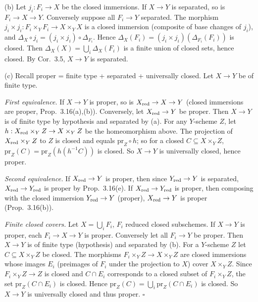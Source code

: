 \documentclass[11pt]{article}
\begin{document}
(b) Let $j_i:F_i\to X$ be the closed immersions. If $X\to Y$ is separated, so is $F_i\to X\to Y$. Conversely suppose all $F_i\to Y$ separated. The morphism $j_i\times j_i:F_i\times_YF_i\to X\times_YX$ is a closed immersion (composite of base changes of $j_i$), and $\Delta_X\circ j_i=(j_i\times j_i)\circ\Delta_{F_i}$. Hence $\Delta_X(F_i)=(j_i\times j_i)(\Delta_{F_i}(F_i))$ is closed. Then $\Delta_X(X)=\bigcup_i\Delta_X(F_i)$ is a finite union of closed sets, hence closed. By Cor.~3.5, $X\to Y$ is separated.

(c) Recall proper = finite type + separated + universally closed. Let $X\to Y$ be of finite type.

\emph{First equivalence.} If $X\to Y$ is proper, so is $X_{\rm red}\to X\to Y$ (closed immersions are proper, Prop.~3.16(a),(b)). Conversely, let $X_{\rm red}\to Y$ be proper. Then $X\to Y$ is of finite type by hypothesis and separated by (a). For any $Y$-scheme $Z$, let $h:X_{\rm red}\times_YZ\to X\times_YZ$ be the homeomorphism above. The projection of $X_{\rm red}\times_YZ$ to $Z$ is closed and equals $\mathrm{pr}_Z\circ h$; so for a closed $C\subseteq X\times_YZ$, $\mathrm{pr}_Z(C)=\mathrm{pr}_Z(h(h^{-1}C))$ is closed. So $X\to Y$ is universally closed, hence proper.

\emph{Second equivalence.} If $X_{\rm red}\to Y$ is proper, then since $Y_{\rm red}\to Y$ is separated, $X_{\rm red}\to Y_{\rm red}$ is proper by Prop.~3.16(e). If $X_{\rm red}\to Y_{\rm red}$ is proper, then composing with the closed immersion $Y_{\rm red}\to Y$ (proper), $X_{\rm red}\to Y$ is proper (Prop.~3.16(b)).

\emph{Finite closed covers.} Let $X=\bigcup_iF_i$, $F_i$ reduced closed subschemes. If $X\to Y$ is proper, each $F_i\to X\to Y$ is proper. Conversely let all $F_i\to Y$ be proper. Then $X\to Y$ is of finite type (hypothesis) and separated by (b). For a $Y$-scheme $Z$ let $C\subseteq X\times_YZ$ be closed. The morphisms $F_i\times_YZ\to X\times_YZ$ are closed immersions whose images $E_i$ (preimages of $F_i$ under the projection to $X$) cover $X\times_YZ$. Since $F_i\times_YZ\to Z$ is closed and $C\cap E_i$ corresponds to a closed subset of $F_i\times_YZ$, the set $\mathrm{pr}_Z(C\cap E_i)$ is closed. Hence $\mathrm{pr}_Z(C)=\bigcup_i\mathrm{pr}_Z(C\cap E_i)$ is closed. So $X\to Y$ is universally closed and thus proper. \hfill$\square$
\end{document}
